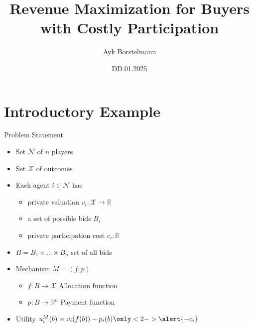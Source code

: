 \documentclass{beamer}
\title{Revenue Maximization for Buyers with Costly Participation}
\date{DD.01.2025}
\author{Ayk Borstelmann}
\institute{
    Seminar Algorithmic Game Theory
}
\begin{document}
\maketitle
\section{Introductory Example}
\begin{frame}{Problem Statement}
  \begin{itemize}
    \item Set $\mathcal{N}$ of $n$ players
    \item Set $\mathcal{X}$ of outcomes
    \item Each agent $i \in \mathcal{N}$ has
          \begin{itemize}
            \item private valuation $v_i: \mathcal{X} \rightarrow \mathbb{R}$
            \item a set of possible bids $B_i$
            \item<2-> \alert{private participation cost $c_i: \mathbb{R}$}
          \end{itemize}
    \item $B = B_1 \times \dots \times B_n$ set of all bids
    \item Mechanism $M = (f,p)$
          \begin{itemize}
            \item $f: B \rightarrow \mathcal{X}$ Allocation function
            \item $p: B \rightarrow \mathbb{R}^n$ Payment function
          \end{itemize}
    \item Utility $u_i^M(b) = v_i(f(b)) - p_i(b) \only<2->{\alert{-c_i}}$
  \end{itemize}
\end{frame}
\end{document}
